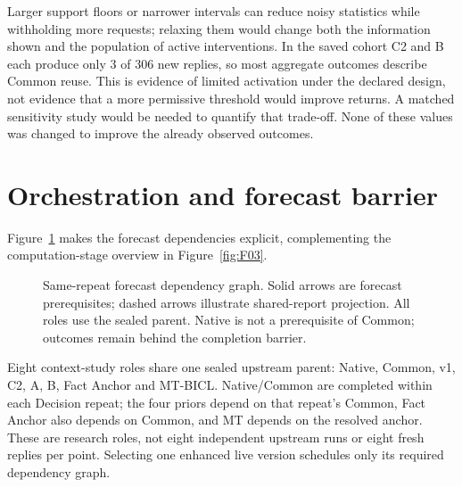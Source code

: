Larger support floors or narrower intervals can reduce noisy statistics
while withholding more requests; relaxing them would change both the
information shown and the population of active interventions. In the
saved cohort C2 and B each produce only 3 of 306 new replies, so most
aggregate outcomes describe Common reuse. This is evidence of limited
activation under the declared design, not evidence that a more permissive
threshold would improve returns. A matched sensitivity study would be
needed to quantify that trade-off. None of these values was changed to
improve the already observed outcomes.

\section{Orchestration and forecast barrier}\label{s:21530b5246fd89f6}
Figure~\ref{fig:dependency-review} makes the forecast dependencies
explicit, complementing the computation-stage overview in Figure~\ref{fig:F03}.
\begin{figure}[!t]\centering
{}
\caption[Same-repeat forecast dependency graph]{Same-repeat forecast dependency graph. Solid arrows are forecast prerequisites; dashed arrows illustrate shared-report projection. All roles use the sealed parent. Native is not a prerequisite of Common; outcomes remain behind the completion barrier.}\label{fig:dependency-review}
\end{figure}
Eight context-study roles share one sealed upstream parent: Native,
Common, v1, C2, A, B, Fact Anchor and MT-BICL. Native/Common are completed
within each Decision repeat; the four priors depend on that repeat's
Common, Fact Anchor also depends on Common, and MT depends on the resolved
anchor. These are research roles, not eight independent upstream runs or
eight fresh replies per point. Selecting one enhanced live version
schedules only its required dependency graph.


